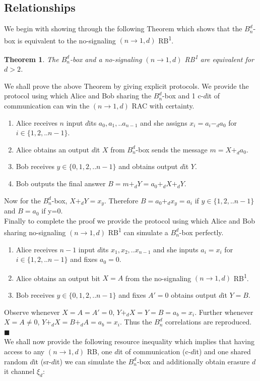 \documentclass[%
 reprint,
 amsmath,amssymb,
 aps,
]{revtex4-1}
\newtheorem{mydef1}{Theorem}
\begin{document}
\subsection*{Relationships}
\noindent We begin with showing through the following Theorem which shows that the $B_n^d$-box is equivalent to the no-signaling $(n\rightarrow 1,d)$ RB\textsuperscript{1}.
\begin{mydef1} \label{thm4}
The $B_n^d$-box and a no-signaling $(n\rightarrow1,d)$ RB\textsuperscript{1} are equivalent for  $d>2$.
\end{mydef1}
We shall prove the above Theorem by giving explicit protocols.
We provide the protocol using which Alice and Bob sharing the $B_n^d$-box and 1 c-$d$it of communication can win the $(n\rightarrow1,d)$ RAC with certainty. 
\begin{enumerate}
\item Alice receives $n$ input $d$its $a_0,a_1,..a_{n-1}$ and she assigns $x_i=a_i-_d a_0$ for $i\in\{1,2,..n-1\}$.
\item Alice obtains an output $d$it $X$ from $B_n^d$-box sends the message $m=X+_d a_0$.
\item Bob receives $y\in\{0,1,2,..n-1\}$ and obtains output $d$it  $Y$. 
\item Bob outputs the final answer $B=m+_dY=a_0+_d X +_d Y$.
\end{enumerate}
\noindent Now for the $B_n^d$-box, $X+_d Y=x_y$. Therefore $B=a_0+_dx_y=a_i$ if $y\in\{1,2,..n-1\}$ and $B=a_0$ if y=0. \\
Finally to complete the proof we provide the protocol using which Alice and Bob sharing no-signaling $(n\rightarrow1,d)$ RB\textsuperscript{1} can simulate a $B_n^d$-box perfectly.
\begin{enumerate}
\item Alice receives $n-1$ input $d$its $x_1,x_2,..x_{n-1}$ and she inputs $a_i=x_i$ for $i\in\{1,2,..n-1\}$ and fixes $a_0=0$.
\item Alice obtains an output bit $X=A$ from the no-signaling $(n\rightarrow 1,d)$ RB\textsuperscript{1}.
\item Bob receives $y\in \{0,1,2,..n-1\}$ and fixes $A'=0$ obtains output $d$it  $Y=B$.
\end{enumerate}
\noindent  Observe whenever $X=A=A'=0$, $Y+_d X=Y=B=a_b=x_i$. Further whenever $X=A\neq 0$, $Y+_dX=B+_dA=a_b=x_i$. Thus the $B_n^d$ correlations are reproduced. $\blacksquare$ \\
We shall now provide the following resource inequality which implies that having access to any $(n\rightarrow1,d)$ RB, one $d$it of communication (c-$d$it) and one shared random $d$it (sr-$d$it) we can simulate the $B_n^d$-box and additionally obtain erasure $d$it channel $\xi_d$:
\end{document}

